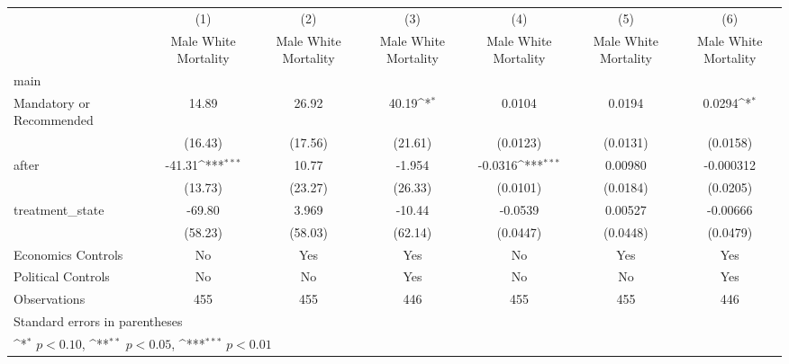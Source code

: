 {
\def\sym#1{\ifmmode^{#1}\else\(^{#1}\)\fi}
\begin{longtable}{l*{6}{c}}
\hline\hline\endfirsthead\hline\endhead\hline\endfoot\endlastfoot
                    &\multicolumn{1}{c}{(1)}&\multicolumn{1}{c}{(2)}&\multicolumn{1}{c}{(3)}&\multicolumn{1}{c}{(4)}&\multicolumn{1}{c}{(5)}&\multicolumn{1}{c}{(6)}\\
                    &\multicolumn{1}{c}{Male White Mortality}&\multicolumn{1}{c}{Male White Mortality}&\multicolumn{1}{c}{Male White Mortality}&\multicolumn{1}{c}{Male White Mortality}&\multicolumn{1}{c}{Male White Mortality}&\multicolumn{1}{c}{Male White Mortality}\\
\hline
main                &                     &                     &                     &                     &                     &                     \\
Mandatory or Recommended&       14.89         &       26.92         &       40.19\sym{*}  &      0.0104         &      0.0194         &      0.0294\sym{*}  \\
                    &     (16.43)         &     (17.56)         &     (21.61)         &    (0.0123)         &    (0.0131)         &    (0.0158)         \\
[1em]
after               &      -41.31\sym{***}&       10.77         &      -1.954         &     -0.0316\sym{***}&     0.00980         &   -0.000312         \\
                    &     (13.73)         &     (23.27)         &     (26.33)         &    (0.0101)         &    (0.0184)         &    (0.0205)         \\
[1em]
treatment\_state     &      -69.80         &       3.969         &      -10.44         &     -0.0539         &     0.00527         &    -0.00666         \\
                    &     (58.23)         &     (58.03)         &     (62.14)         &    (0.0447)         &    (0.0448)         &    (0.0479)         \\
[1em]
Economics Controls  &          No         &         Yes         &         Yes         &          No         &         Yes         &         Yes         \\
[1em]
Political Controls  &          No         &          No         &         Yes         &          No         &          No         &         Yes         \\
\hline
Observations        &         455         &         455         &         446         &         455         &         455         &         446         \\
\hline\hline
\multicolumn{7}{l}{\footnotesize Standard errors in parentheses}\\
\multicolumn{7}{l}{\footnotesize \sym{*} \(p<0.10\), \sym{**} \(p<0.05\), \sym{***} \(p<0.01\)}\\
\end{longtable}
}
